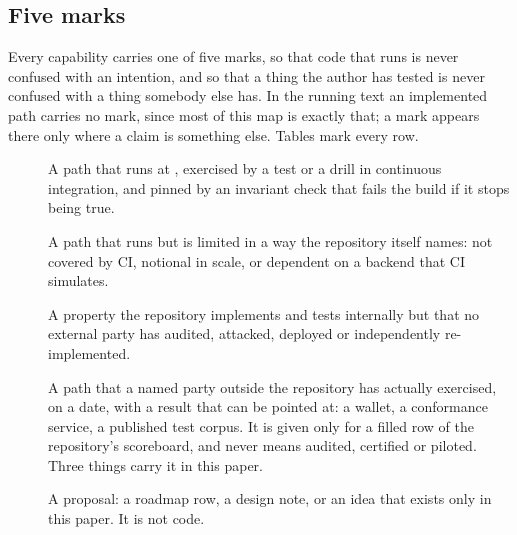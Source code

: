 \subsection*{Five marks}

Every capability carries one of five marks, so that code that runs is never confused with an
intention, and so that a thing the author has tested is never confused with a thing somebody else
has. In the running text an implemented path carries no mark, since most of this map is exactly
that; a mark appears there only where a claim is something else. Tables mark every row.

\begin{description}
  \item[\sImplMark] A path that runs at , exercised by a test or a drill in continuous
    integration, and pinned by an invariant check that fails the build if it stops being true.
  \item[\sExp] A path that runs but is limited in a way the repository itself names: not covered by
    CI, notional in scale, or dependent on a backend that CI simulates.
  \item[\sExt] A property the repository implements and tests internally but that no external
    party has audited, attacked, deployed or independently re-implemented.
  \item[\sWit] A path that a named party outside the repository has actually exercised, on a date,
    with a result that can be pointed at: a wallet, a conformance service, a published test corpus.
    It is given only for a filled row of the repository's scoreboard, and never means audited,
    certified or piloted. Three things carry it in this paper.
  \item[\sFut] A proposal: a roadmap row, a design note, or an idea that exists only in this paper.
    It is not code.
\end{description}

